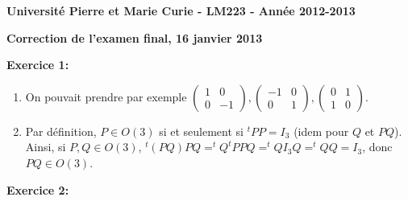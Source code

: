 \documentclass[a4paper, 11pt]{article}
\theoremstyle{plain}
\begin{document}
\noindent
\large
\textbf{Universit\'e Pierre et Marie Curie 
 - LM223 -
Ann\'ee 2012-2013}\\

\begin{center}
\Large
\textbf{Correction de l'examen final, 16 janvier 2013}
\end{center}
\normalsize

\medskip
\noindent
\textbf{Exercice 1:}\\
\begin{enumerate}
\item
On pouvait prendre par exemple
$\begin{pmatrix}
1&0\\0&-1
\end{pmatrix}
, \begin{pmatrix}
-1&0\\0&1
\end{pmatrix}, 
\begin{pmatrix}
0&1\\1&0
\end{pmatrix}$.
\item Par définition, 
$P\in O(3)$ si et seulement si 
$^tPP=I_3$ (idem pour $Q$ et $PQ$). 
Ainsi, si $P,Q \in O(3)$, 
$^t(PQ)PQ = ^tQ^tPPQ = ^tQ I_3 Q = ^tQQ=I_3$, 
donc $PQ \in O(3)$.

\end{enumerate}

\bigskip
\noindent
\textbf{Exercice 2:}\\
\end{document}
